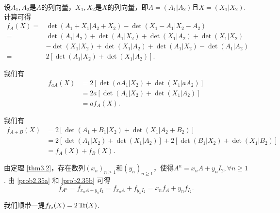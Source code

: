 \begin{solution}
  设$A_1,A_2$是$A$的列向量，$X_1,X_2$是$X$的列向量，即$A=(A_1|A_2)$且$X=(X_1|X_2)$. 计算可得
  \begin{align*}
    f_A(X) = {}& \det (A_1 + X_1|A_2 + X_2) - \det(X_1-A_1|X_2 - A_2) \\
    = {}& \det (A_1|A_2) + \det(A_1|X_2) + \det(X_1|A_2) + \det (X_1|X_2) \\
      & - \det(X_1|X_2) + \det(X_1|A_2) + \det(A_1|X_2) - \det(A_1|A_2) \\
    = {}& 2[\det(A_1|X_2) + \det(X_1|A_2)].
  \end{align*}

  \begin{inparaenum}[(a)]
    \item 我们有
      \begin{align*}
        f_{aA}(X) & = 2 [ \det(aA_1|X_2) + \det(X_1|aA_2) ] \\
        & = 2a[ \det(A_1|X_2) + \det(X_1|A_2) ] \\
        & = af_A(X).
      \end{align*}

    \item 我们有
      \begin{align*}
        f_{A+B}(X) & = 2[ \det(A_1+B_1|X_2) + \det(X_1|A_2+B_2) ] \\
        & =  2 [ \det(A_1|X_2) + \det(X_1|A_2) ] +
             2 [ \det(B_1|X_2) + \det(X_1|B_2) ] \\
        & = f_A(X) + f_B(X).
      \end{align*}

    \item 由定理 \ref{thm3.2}，存在数列$(x_n)_{n\ge1}$和$(y_n)_{n\ge1}$，使得$A^n=x_nA+y_nI_2,\forall n\ge1$. 由 \ref{prob2.35a} 和 \ref{prob2.35b} 可得
        \[
          f_{A^n} = f_{x_nA+y_nI_2} = f_{x_nA} + f_{y_nI_2} = x_nf_A + y_nf_{I_2}.
        \]
  \end{inparaenum}

  我们顺带一提$f_{I_2}(X)=2\operatorname{Tr}(X)$.
\end{solution}

\setcounter{solution}{36}

